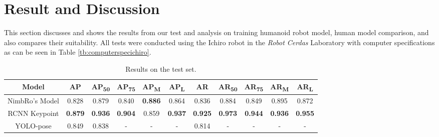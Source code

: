 \section{Result and Discussion}
\label{sec:result-and-discussion}

This section discusses and shows the results from our test and analysis on training humanoid robot model, human model comparison, and also compares their suitability.
All tests were conducted using the Ichiro robot in the \emph{Robot Cerdas} Laboratory with computer specifications as can be seen in Table \ref{tb:computerspecichiro}.

\begin{table}[t]
\caption{Results on the test set.}
\centering
    \begin{tabular}{|c|c|c|c|c|c|c|c|c|c|c|} 
    \hline
    \rowcolor{lightgray} \textbf{Model} & \textbf{AP} & \textbf{AP\textsubscript{50}} & \textbf{AP\textsubscript{75}} & \textbf{AP\textsubscript{M}} & \textbf{AP\textsubscript{L}} & \textbf{AR} & \textbf{AR\textsubscript{50}} & \textbf{AR\textsubscript{75}} & \textbf{AR\textsubscript{M}} & \textbf{AR\textsubscript{L}} \\ 
    \hline
    NimbRo's Model        & 0.828       & 0.879                         & 0.840                         & \textbf{0.886}                         & 0.864                        & 0.836       & 0.884                         & 0.849                         & 0.895                        & 0.872 \\
    \hline
    RCNN Keypoint           & \textbf{0.879}       & \textbf{0.936}                         & \textbf{0.904}                         & 0.859                        & \textbf{0.937}                       & \textbf{0.925}       & \textbf{0.973}                         & \textbf{0.944}                         & \textbf{0.936}                        & \textbf{0.955} \\
    \hline
    YOLO-pose           & 0.849       & 0.838                         & -                             & -                            & -                            & 0.814       & -                             & -                             & -                            & - \\
    \hline
    \end{tabular}
    \label{tb:result-on-test-set}\\
\end{table}

